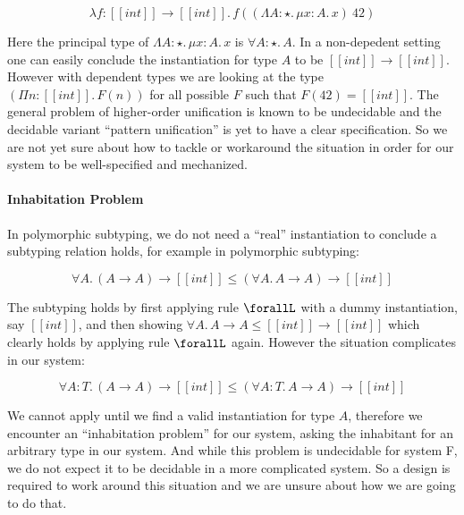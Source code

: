 \begin{equation*}
    \lambda f : [[int]] \rightarrow [[int]].\, f ((\Lambda A : \star.\,\mu x : A.\, x)~42)
\end{equation*}

Here the principal type of $\Lambda A : \star.\,\mu x : A.\, x$ is $\forall A : \star.\, A$.
In a non-depedent setting one can easily conclude the instantiation for type $A$ to be
 $[[int]] \rightarrow [[int]]$. However with dependent types we are looking at
the type $(\Pi n : [[int]].\, F(n))$ for all possible $F$ such that $F(42) = [[int]]$.
The general problem of higher-order unification is known to be undecidable\cite{goldfarb1981undecidability}
and the decidable variant ``pattern unification''\cite{miller1991unification}
is yet to have a clear specification.
So we are not yet sure about how to tackle or workaround the situation in order
for our system to be well-specified and mechanized.

\paragraph{Inhabitation Problem}

In polymorphic subtyping, we do not need a ``real'' instantiation to conclude
a subtyping relation holds, for example in polymorphic subtyping:

\begin{equation*}
    \forall A.\, (A \rightarrow A) \rightarrow [[int]] \le (\forall A.\, A \rightarrow A) \rightarrow [[int]]
\end{equation*}

The subtyping holds by first applying rule $\forallL$ with a dummy instantiation,
say $[[int]]$, and then showing $\forall A.\, A \rightarrow A \le [[int]] \rightarrow [[int]]$
which clearly holds by applying rule $\forallL$ again. However the situation
complicates in our system:

\begin{equation*}
    \forall A : T.\, (A \rightarrow A) \rightarrow [[int]] \le (\forall A : T.\, A \rightarrow A) \rightarrow [[int]]
\end{equation*}

We cannot apply  until we find a valid instantiation for type $A$,
therefore we encounter an ``inhabitation problem'' for our system, asking the
inhabitant for an arbitrary type in our system. And while this problem is
undecidable for system F\cite{dudenhefner2019simpler}, we do not expect it to be
decidable in a more complicated system. So a design is required to work around
this situation and we are unsure about how we are going to do that.
